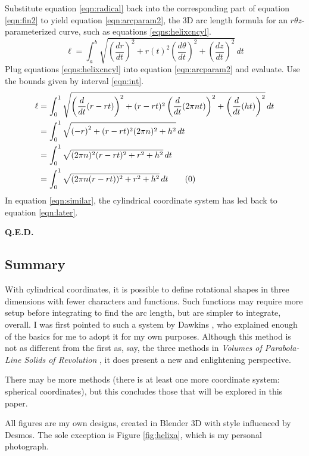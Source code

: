 \documentclass{article}
\begin{document}
Substitute equation \ref{eqn:radical} back into the corresponding part of equation \ref{eqn:fin2} to yield equation \ref{eqn:arcparam2}, the 3D arc length formula for an $r\theta z$-parameterized curve, such as equations \ref{eqns:helixcncyl}.
\begin{equation}\label{eqn:arcparam2}
    \ell = \int_a^b\sqrt{\left(\frac{dr}{dt}\right)^2+r(t)^2\left(\frac{d\theta}{dt}\right)^2+\left(\frac{dz}{dt}\right)^2}\, dt
\end{equation}
Plug equations \ref{eqns:helixcncyl} into equation \ref{eqn:arcparam2} and evaluate. Use the bounds given by interval \ref{eqn:int}.
\begin{align*}
    \ell &= \int_0^1\sqrt{\left(\frac{d}{dt}(r-rt)\right)^2+(r-rt)^2\left(\frac{d}{dt}(2\pi nt)\right)^2+\left(\frac{d}{dt}(ht)\right)^2}\, dt\\
    &= \int_0^1\sqrt{\left(-r\right)^2+(r-rt)^2(2\pi n)^2+h^2}\, dt\\
    &= \int_0^1\sqrt{(2\pi n)^2(r-rt)^2+r^2+h^2}\, dt\\
    &= \int_0^1\sqrt{(2\pi n(r-rt))^2+r^2+h^2}\, dt\tag{\theequation}\label{eqn:similar}
    \stepcounter{equation}
\end{align*}
In equation \ref{eqn:similar}, the cylindrical coordinate system has led back to equation \ref{eqn:later}.
\begin{flushright}
    \textbf{Q.E.D.}
\end{flushright}


\subsection{Summary}
With cylindrical coordinates, it is possible to define rotational shapes in three dimensions with fewer characters and functions. Such functions may require more setup before integrating to find the arc length, but are simpler to integrate, overall. I was first pointed to such a system by Dawkins \cite{Bib:cylcords}, who explained enough of the basics for me to adopt it for my own purposes. Although this method is not as different from the first as, say, the three methods in \emph{Volumes of Parabola-Line Solids of Revolution} \cite{Bib:SORVolumes}, it does present a new and enlightening perspective.\par
There may be more methods (there is at least one more coordinate system: spherical coordinates), but this concludes those that will be explored in this paper.
\newpage



\setcounter{secnumdepth}{0}


All figures are my own designs, created in Blender 3D with style influenced by Desmos. The sole exception is Figure \ref{fig:helixa}, which is my personal photograph.
\end{document}
